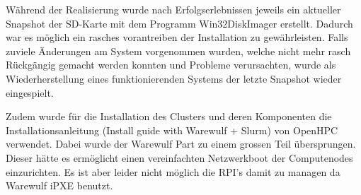 Während der Realisierung wurde nach Erfolgserlebnissen jeweils ein aktueller Snapshot der SD-Karte mit dem Programm Win32DiskImager erstellt. Dadurch war es möglich ein rasches vorantreiben der Installation zu gewährleisten. Falls zuviele Änderungen am System vorgenommen wurden, welche nicht mehr rasch Rückgängig gemacht werden konnten und Probleme verursachten, wurde als Wiederherstellung eines funktionierenden Systems der letzte Snapshot wieder eingespielt.

Zudem wurde für die Installation des Clusters und deren Komponenten die Installationsanleitung (Install guide with Warewulf + Slurm) von OpenHPC verwendet. Dabei wurde der Warewulf Part zu einem grossen Teil übersprungen. Dieser hätte es ermöglicht einen vereinfachten Netzwerkboot der Computenodes einzurichten. Es ist aber leider nicht möglich die RPI's damit zu managen da Warewulf iPXE benutzt.








